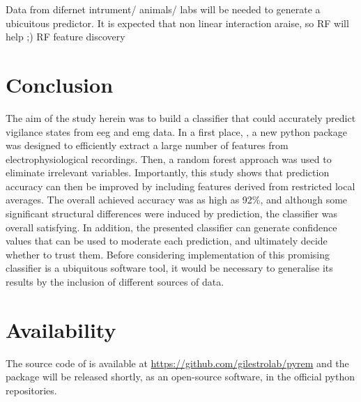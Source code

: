 Data from difernet intrument/ animals/ labs will be needed to generate a ubicuitous predictor.
It is expected that non linear interaction araise, so RF will help ;)
RF feature discovery


\section{Conclusion}

The aim of the study herein was to build a classifier that could accurately predict vigilance states from \gls{eeg} and \gls{emg} data.
In a first place, \pr{}, a new python package was designed to efficiently extract a large number of features from electrophysiological recordings.
Then, a random forest approach was used to eliminate irrelevant variables.
Importantly, this study shows that prediction accuracy can then be improved by including features derived from restricted local averages.
The overall achieved accuracy was as high as 92\%, and although some significant structural differences were induced by prediction,
the classifier was overall satisfying.
In addition, the presented classifier can generate confidence values that can be used to moderate each prediction, and ultimately decide whether to trust them.
Before considering implementation of this promising classifier is a ubiquitous software tool,
it would be necessary to generalise its results by the inclusion of different sources of data.

\section{Availability}
The source code of \pr{} is available at \href{https://github.com/gilestrolab/pyrem}{https://github.com/gilestrolab/pyrem}
and the package will be released shortly, as an open-source software, in the official python repositories.


